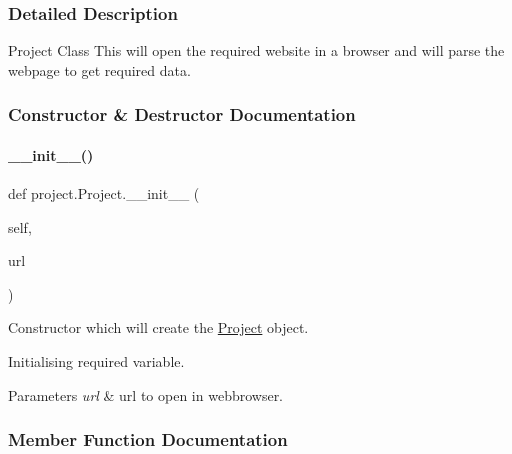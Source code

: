 \subsubsection{Detailed Description}
\begin{DoxyVerb}Project Class
This will open the required website in a browser and will parse the webpage to get required data.
\end{DoxyVerb}
 

\subsubsection{Constructor \& Destructor Documentation}
\mbox{\label{classproject_1_1Project_a704727c31e05086eb487df5709f3dc11}} 
\paragraph{\texorpdfstring{\+\_\+\+\_\+init\+\_\+\+\_\+()}{\_\_init\_\_()}}
{\footnotesize\ttfamily def project.\+Project.\+\_\+\+\_\+init\+\_\+\+\_\+ (\begin{DoxyParamCaption}\item[{}]{self,  }\item[{}]{url }\end{DoxyParamCaption})}



Constructor which will create the \hyperlink{classproject_1_1Project}{Project} object. 

Initialising required variable. 
\begin{DoxyParams}{Parameters}
{\em url} & url to open in webbrowser. \\
\hline
\end{DoxyParams}


\subsubsection{Member Function Documentation}
\mbox{\label{classproject_1_1Project_a6a082d685dd38ddf6431e1a8062d64ab}} 
